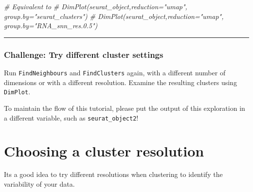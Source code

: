 \documentclass[
]{book}
\newenvironment{Shaded}{\begin{snugshade}}{\end{snugshade}}
\newcommand{\CommentTok}[1]{\textcolor[rgb]{0.56,0.35,0.01}{\textit{#1}}}
\begin{document}
\begin{Shaded}
\begin{Highlighting}[]
\CommentTok{\# Equivalent to}
\CommentTok{\# DimPlot(seurat\_object,reduction="umap", group.by="seurat\_clusters")}
\CommentTok{\# DimPlot(seurat\_object,reduction="umap", group.by="RNA\_snn\_res.0.5")}
\end{Highlighting}
\end{Shaded}

\begin{center}\rule{0.5\linewidth}{0.5pt}\end{center}

\hypertarget{challenge-try-different-cluster-settings}{%
\subsubsection*{Challenge: Try different cluster settings}\label{challenge-try-different-cluster-settings}}

Run \texttt{FindNeighbours} and \texttt{FindClusters} again, with a different number of dimensions or with a different resolution. Examine the resulting clusters using \texttt{DimPlot}.

To maintain the flow of this tutorial, please put the output of this exploration in a different variable, such as \texttt{seurat\_object2}!

\hypertarget{section-10}{%
\subsubsection*{}\label{section-10}}

\hypertarget{choosing-a-cluster-resolution}{%
\section{Choosing a cluster resolution}\label{choosing-a-cluster-resolution}}

Its a good idea to try different resolutions when clustering to identify the variability of your data.
\end{document}
